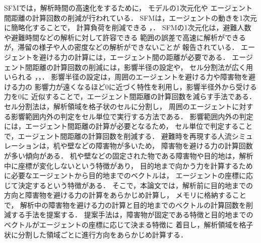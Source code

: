 SFMでは，解析時間の高速化をするために，
モデルの1次元化や
エージェント間距離の計算回数の削減が行われている．
%
SFMは，エージェントの動きを1次元に簡略化することで，
計算負荷を削減できる
\cite{1ji_sfm1}，\cite{1ji_sfm2}．
SFMの1次元化は，避難人数や避難時間などの解析に対して許容できる
範囲の誤差で高速に解析ができるが，滞留の様子や人の密度などの解析ができないことが
報告されている\cite{1ji_sfm1}．
%
エージェントを避ける力の計算には，エージェント間の距離が必要である．
エージェント間距離の計算回数の削減には，影響半径の設定や，
セル分割法が広く用いられる
\cite{seru_sfm1}，\cite{seru_sfm2}，\cite{katayose}．
影響半径の設定は，周囲のエージェントを避ける力や障害物を避ける力の
影響力が遠くなるほど0に近づく特性を利用し，影響半径外から受ける力を0に
近似することで，エージェント間距離の計算回数を減らす手法である．
セル分割法は，解析領域を格子状のセルに分割し，
周囲のエージェントに対する影響範囲内外の判定をセル単位で実行する方法である．
影響範囲内外の判定には，エージェント間距離の計算が必要となるため，
セル単位で判定することで，エージェント間距離の計算回数を削減する．
避難時を再現する人流シミュレーションは，机や壁などの障害物が多いため，
障害物を避ける力の計算回数が多い傾向がある．
机や壁などの固定された物である障害物や目的地は，解析中に座標が変化しないという特徴があり，
目的地まで向かう力を計算するために必要なエージェントから目的地までのベクトルは，
エージェントの座標に応じて決定するという特徴がある．
そこで，本論文では，解析前に目的地までの方向と障害物を避ける力の計算をあらかじめ計算し，
メモリに格納することで，
解析中の障害物を避ける力の計算と目的地までのベクトルの計算回数を削減する手法を提案する．
提案手法は，障害物が固定である特徴と目的地までのベクトルがエージェントの座標に応じて決まる特徴に
着目し，解析領域を格子状に分割した領域ごとに進行方向をあらかじめ計算する．
\fi 



